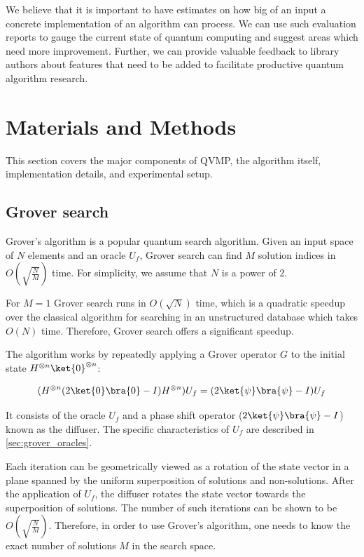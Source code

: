 \documentclass[11pt]{article}
\theoremstyle{definition}
\theoremstyle{remark}
\begin{document}
We believe that it is important to have estimates on how big of an input a
concrete implementation of an algorithm can process. We can use such evaluation
reports to gauge the current state of quantum computing and suggest areas which
need more improvement. Further, we can provide valuable feedback to library
authors about features that need to be added to facilitate productive quantum
algorithm research.

\section{Materials and Methods}

This section covers the major components of QVMP, the algorithm itself,
implementation details, and experimental setup.

\subsection{Grover search} \label{sec:grover_search}

Grover’s algorithm is a popular quantum search algorithm. Given an input space
of $N$ elements and an oracle $U_f$, Grover search can find $M$ solution
indices in $O(\sqrt{\frac{N}{M}})$ time. For simplicity, we assume that $N$ is
a power of 2. 

For $M = 1$ Grover search runs in $O(\sqrt{N})$ time, which is a quadratic
speedup over the classical algorithm for searching in an unstructured database
which takes $O(N)$ time. Therefore, Grover search offers a significant speedup.

The algorithm works by repeatedly applying a Grover operator $G$ to the initial
state $H^{\otimes n}\ket{0}^{\otimes n }$:

\begin{equation}
  (H^{\otimes n}(2\ket{0}\bra{0} - I)H^{\otimes n})U_f = (2\ket{\psi}\bra{\psi} - I)U_f
\end{equation}

It consists of the oracle $U_f$ and a phase shift operator
($2\ket{\psi}\bra{\psi} - I$) known as the diffuser. The specific
characteristics of $U_f$ are described in \cref{sec:grover_oracles}.

Each iteration can be geometrically viewed as a rotation of the state vector in
a plane spanned by the uniform superposition of solutions and non-solutions.
After the application of $U_f$, the diffuser rotates the state vector towards
the superposition of solutions. The number of such iterations can be shown to
be  $O(\sqrt{\frac{N}{M}})$. Therefore, in order to use Grover’s algorithm, one
needs to know the exact number of solutions $M$ in the search space.
\end{document}
